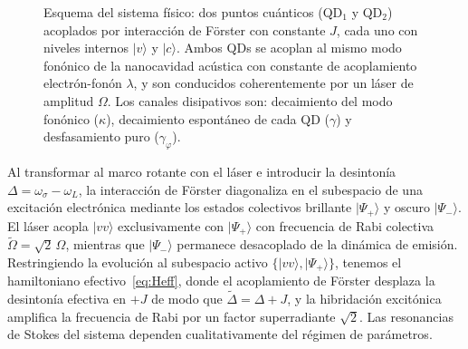 \begin{figure}[htb]
	\caption{Esquema del sistema físico: dos puntos cuánticos (QD$_1$ y QD$_2$) acoplados por interacción de Förster con constante $J$, cada uno con niveles internos $|v\rangle$ y $|c\rangle$. Ambos QDs se acoplan al mismo modo fonónico de la nanocavidad acústica con constante de acoplamiento electrón-fonón $\lambda$, y son conducidos coherentemente por un láser de amplitud $\Omega$. Los canales disipativos son: decaimiento del modo fonónico ($\kappa$), decaimiento espontáneo de cada QD ($\gamma$) y desfasamiento puro ($\gamma_\varphi$).}
	\label{fig:sistema_2qd}
\end{figure}

Al transformar al marco rotante con el láser e introducir la desintonía $\Delta = \omega_\sigma - \omega_L$, la interacción de Förster diagonaliza en el subespacio de una excitación electrónica mediante los estados colectivos brillante $|\Psi_+\rangle$ y oscuro $|\Psi_-\rangle$. El láser acopla $|vv\rangle$ exclusivamente con $|\Psi_+\rangle$ con frecuencia de Rabi colectiva $\widetilde\Omega = \sqrt{2}\,\Omega$, mientras que $|\Psi_-\rangle$ permanece desacoplado de la dinámica de emisión. Restringiendo la evolución al subespacio activo $\{|vv\rangle, |\Psi_+\rangle\}$, tenemos el hamiltoniano efectivo~\eqref{eq:Heff}, donde el acoplamiento de Förster desplaza la desintonía efectiva en $+J$ de modo que $\widetilde\Delta = \Delta + J$, y la hibridación excitónica amplifica la frecuencia de Rabi por un factor superradiante $\sqrt{2}$. Las resonancias de Stokes del sistema dependen cualitativamente del régimen de parámetros. \\

